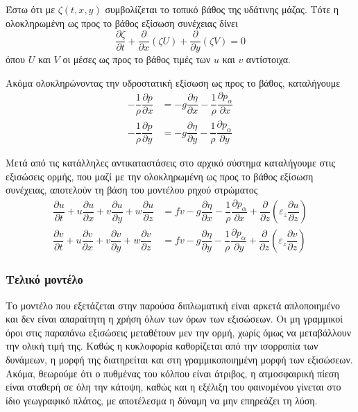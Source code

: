 Έστω ότι με $ζ(t, x, y)$ συμβολίζεται το τοπικό βάθος της υδάτινης μάζας. Τότε η ολοκληρωμένη ως προς το βάθος εξίσωση συνέχειας δίνει
\begin{equation}
    \dfrac{\partial{ζ}}{\partial{t}} + \dfrac{\partial}{\partial{x}}\left(ζU\right) + \dfrac{\partial}{\partial{y}}\left(ζV\right) = 0 \label{eq:int-cont}
\end{equation}
όπου $U$ και $V$ οι μέσες ως προς το βάθος τιμές των $u$ και $v$ αντίστοιχα.

Ακόμα ολοκληρώνοντας την υδροστατική εξίσωση ως προς το βάθος, καταλήγουμε
\begin{align}
    -\dfrac{1}{ρ}\dfrac{\partial{p}}{\partial{x}} &= -g\dfrac{\partial{η}}{\partial{x}}-\dfrac{1}{ρ}\dfrac{\partial{p_α}}{\partial{x}} \\
    -\dfrac{1}{ρ}\dfrac{\partial{p}}{\partial{y}} &= -g\dfrac{\partial{η}}{\partial{y}}-\dfrac{1}{ρ}\dfrac{\partial{p_α}}{\partial{y}}
\end{align}

Μετά από τις κατάλληλες αντικαταστάσεις στο αρχικό σύστημα καταλήγουμε στις εξισώσεις ορμής, που μαζί με την ολοκληρωμένη ως προς το βάθος εξίσωση συνέχειας, αποτελούν τη βάση του μοντέλου ρηχού στρώματος
\begin{align}
    \dfrac{\partial{u}}{\partial{t}} + u\dfrac{\partial{u}}{\partial{x}} + v\dfrac{\partial{u}}{\partial{y}} + w\dfrac{\partial{u}}{\partial{z}} &= fv-g\dfrac{\partial{η}}{\partial{x}}-\dfrac{1}{ρ}\dfrac{\partial{p_α}}{\partial{x}} + \dfrac{\partial}{\partial{z}}\left(ε_z\dfrac{\partial{u}}{\partial{z}}\right) \label{eq:u-mom-non}\\
    \dfrac{\partial{v}}{\partial{t}} + u\dfrac{\partial{v}}{\partial{x}} + v\dfrac{\partial{v}}{\partial{y}} + w\dfrac{\partial{v}}{\partial{z}} &= fv-g\dfrac{\partial{η}}{\partial{y}}-\dfrac{1}{ρ}\dfrac{\partial{p_α}}{\partial{y}} + \dfrac{\partial}{\partial{z}}\left(ε_z\dfrac{\partial{v}}{\partial{z}}\right) \label{eq:v-mom-non}
\end{align}

\subsubsection{Τελικό μοντέλο}
Το μοντέλο που εξετάζεται στην παρούσα διπλωματική είναι αρκετά απλοποιημένο και δεν είναι απαραίτητη η χρήση όλων των όρων των εξισώσεων. Οι μη γραμμικοί όροι στις παραπάνω εξισώσεις μεταθέτουν μεν την ορμή, χωρίς όμως να μεταβάλλουν την ολική τιμή της. Καθώς η κυκλοφορία καθορίζεται από την ισορροπία των δυνάμεων, η μορφή της διατηρείται και στη γραμμικοποιημένη μορφή των εξισώσεων. Ακόμα, θεωρούμε ότι ο πυθμένας του κόλπου είναι άτριβος, η ατμοσφαιρική πίεση είναι σταθερή σε όλη την κάτοψη, καθώς και η εξέλιξη του φαινομένου γίνεται στο ίδιο γεωγραφικό πλάτος, με αποτέλεσμα η δύναμη \cor να μην επηρεάζει τη λύση.

